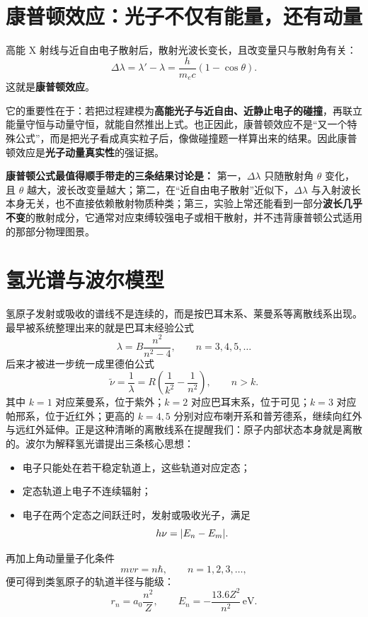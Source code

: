 \documentclass[lang=cn,11pt]{elegantbook}
\begin{document}
\section{康普顿效应：光子不仅有能量，还有动量}

高能 X 射线与近自由电子散射后，散射光波长变长，且改变量只与散射角有关：
\[
\Delta \lambda
=\lambda'-\lambda
=\frac{h}{m_ec}(1-\cos\theta).
\]
这就是\textbf{康普顿效应}。

它的重要性在于：若把过程建模为\textbf{高能光子与近自由、近静止电子的碰撞}，再联立能量守恒与动量守恒，就能自然推出上式。也正因此，康普顿效应不是“又一个特殊公式”，而是把光子看成真实粒子后，像做碰撞题一样算出来的结果。因此康普顿效应是\textbf{光子动量真实性}的强证据。

\begin{remark}
\textbf{康普顿公式最值得顺手带走的三条结果讨论是：} 第一，\(\Delta\lambda\) 只随散射角 \(\theta\) 变化，且 \(\theta\) 越大，波长改变量越大；第二，在“近自由电子散射”近似下，\(\Delta\lambda\) 与入射波长本身无关，也不直接依赖散射物质种类；第三，实验上常还能看到一部分\textbf{波长几乎不变}的散射成分，它通常对应束缚较强电子或相干散射，并不违背康普顿公式适用的那部分物理图景。
\end{remark}

\section{氢光谱与波尔模型}

氢原子发射或吸收的谱线不是连续的，而是按巴耳末系、莱曼系等离散线系出现。最早被系统整理出来的就是巴耳末经验公式
\[
\lambda=B\frac{n^2}{n^2-4},
\qquad n=3,4,5,\dots
\]
后来才被进一步统一成里德伯公式
\[
\tilde{\nu}=\frac{1}{\lambda}=R\left(\frac{1}{k^2}-\frac{1}{n^2}\right),
\qquad n>k.
\]
其中 \(k=1\) 对应莱曼系，位于紫外；\(k=2\) 对应巴耳末系，位于可见；\(k=3\) 对应帕邢系，位于近红外；更高的 \(k=4,5\) 分别对应布喇开系和普芳德系，继续向红外与远红外延伸。正是这种清晰的离散线系在提醒我们：原子内部状态本身就是离散的。波尔为解释氢光谱提出三条核心思想：
\begin{itemize}
  \item 电子只能处在若干稳定轨道上，这些轨道对应定态；
  \item 定态轨道上电子不连续辐射；
  \item 电子在两个定态之间跃迁时，发射或吸收光子，满足
  \[
  h\nu=\abs{E_n-E_m}.
  \]
\end{itemize}

再加上角动量量子化条件
\[
mvr=n\hbar,
\qquad n=1,2,3,\dots,
\]
便可得到类氢原子的轨道半径与能级：
\[
r_n=a_0\frac{n^2}{Z},
\qquad
E_n=-\frac{13.6Z^2}{n^2}\,\mathrm{eV}.
\]
\end{document}

